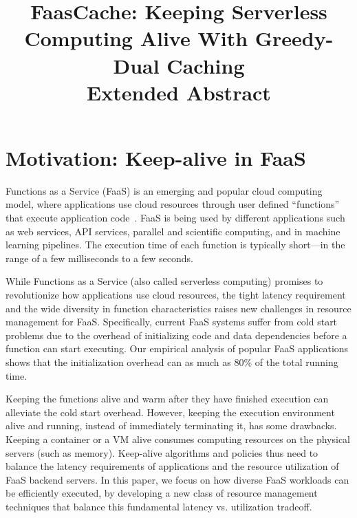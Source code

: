 \documentclass[pageno]{jpaper}
\begin{document}

\title{FaasCache: Keeping Serverless Computing Alive With Greedy-Dual Caching \\
Extended Abstract}

\date{}

\author{}

\maketitle 

\thispagestyle{empty}

\section{Motivation: Keep-alive in FaaS}
\vspace*{\subsecspace}
Functions as a Service (FaaS) is an emerging and popular cloud computing model, where applications use cloud resources through user defined ``functions'' that execute application code~\cite{jonas_cloud_2019}.
%
FaaS is being used by different applications such as web services, API services, parallel and scientific computing, and in machine learning pipelines. 
%
The execution time of each function is typically short---in the range of a few milliseconds to a few seconds. 


While Functions as a Service (also called serverless computing) promises to revolutionize how applications use cloud resources, the tight latency requirement and the wide diversity in function characteristics raises new challenges in resource management for FaaS. 
%
Specifically, current FaaS systems suffer from cold start problems due to the overhead of initializing code and data dependencies before a function can start executing.
Our empirical analysis of popular FaaS applications shows that the initialization overhead can as much as 80\% of the total running time. 

Keeping the functions alive and warm after they have finished execution can alleviate the cold start overhead.  
However, keeping the execution environment alive and running, instead of immediately terminating it, has some drawbacks. 
Keeping a container or a VM alive consumes computing resources on the physical servers (such as memory). 
Keep-alive algorithms and policies thus need to balance the latency requirements of applications and the resource utilization of FaaS backend servers.
%
In this paper, we focus on how diverse FaaS workloads can be efficiently executed, by developing a new class of resource management techniques that balance this fundamental latency vs. utilization tradeoff. 
\end{document}
